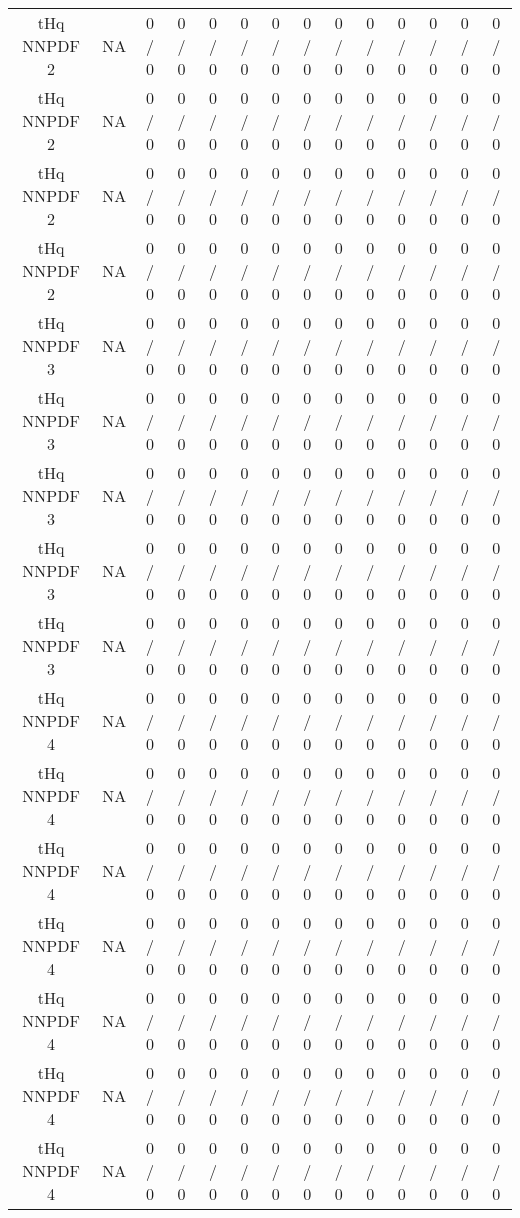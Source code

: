 \documentclass[10pt]{article}
\begin{document}
\begin{table}[htbp]
\begin{center}
\begin{tabular}{|c|c|c|c|c|c|c|c|c|c|c|c|c|c|}
  tHq NNPDF 2 &    NA    & 0 / 0 & 0 / 0 & 0 / 0 & 0 / 0 & 0 / 0 & 0 / 0 & 0 / 0 & 0 / 0 & 0 / 0 & 0 / 0 & 0 / 0 & 0 / 0 \\ 
  tHq NNPDF 2 &    NA    & 0 / 0 & 0 / 0 & 0 / 0 & 0 / 0 & 0 / 0 & 0 / 0 & 0 / 0 & 0 / 0 & 0 / 0 & 0 / 0 & 0 / 0 & 0 / 0 \\ 
  tHq NNPDF 2 &    NA    & 0 / 0 & 0 / 0 & 0 / 0 & 0 / 0 & 0 / 0 & 0 / 0 & 0 / 0 & 0 / 0 & 0 / 0 & 0 / 0 & 0 / 0 & 0 / 0 \\ 
  tHq NNPDF 2 &    NA    & 0 / 0 & 0 / 0 & 0 / 0 & 0 / 0 & 0 / 0 & 0 / 0 & 0 / 0 & 0 / 0 & 0 / 0 & 0 / 0 & 0 / 0 & 0 / 0 \\ 
  tHq NNPDF 3 &    NA    & 0 / 0 & 0 / 0 & 0 / 0 & 0 / 0 & 0 / 0 & 0 / 0 & 0 / 0 & 0 / 0 & 0 / 0 & 0 / 0 & 0 / 0 & 0 / 0 \\ 
  tHq NNPDF 3 &    NA    & 0 / 0 & 0 / 0 & 0 / 0 & 0 / 0 & 0 / 0 & 0 / 0 & 0 / 0 & 0 / 0 & 0 / 0 & 0 / 0 & 0 / 0 & 0 / 0 \\ 
  tHq NNPDF 3 &    NA    & 0 / 0 & 0 / 0 & 0 / 0 & 0 / 0 & 0 / 0 & 0 / 0 & 0 / 0 & 0 / 0 & 0 / 0 & 0 / 0 & 0 / 0 & 0 / 0 \\ 
  tHq NNPDF 3 &    NA    & 0 / 0 & 0 / 0 & 0 / 0 & 0 / 0 & 0 / 0 & 0 / 0 & 0 / 0 & 0 / 0 & 0 / 0 & 0 / 0 & 0 / 0 & 0 / 0 \\ 
  tHq NNPDF 3 &    NA    & 0 / 0 & 0 / 0 & 0 / 0 & 0 / 0 & 0 / 0 & 0 / 0 & 0 / 0 & 0 / 0 & 0 / 0 & 0 / 0 & 0 / 0 & 0 / 0 \\ 
  tHq NNPDF 4 &    NA    & 0 / 0 & 0 / 0 & 0 / 0 & 0 / 0 & 0 / 0 & 0 / 0 & 0 / 0 & 0 / 0 & 0 / 0 & 0 / 0 & 0 / 0 & 0 / 0 \\ 
  tHq NNPDF 4 &    NA    & 0 / 0 & 0 / 0 & 0 / 0 & 0 / 0 & 0 / 0 & 0 / 0 & 0 / 0 & 0 / 0 & 0 / 0 & 0 / 0 & 0 / 0 & 0 / 0 \\ 
  tHq NNPDF 4 &    NA    & 0 / 0 & 0 / 0 & 0 / 0 & 0 / 0 & 0 / 0 & 0 / 0 & 0 / 0 & 0 / 0 & 0 / 0 & 0 / 0 & 0 / 0 & 0 / 0 \\ 
  tHq NNPDF 4 &    NA    & 0 / 0 & 0 / 0 & 0 / 0 & 0 / 0 & 0 / 0 & 0 / 0 & 0 / 0 & 0 / 0 & 0 / 0 & 0 / 0 & 0 / 0 & 0 / 0 \\ 
  tHq NNPDF 4 &    NA    & 0 / 0 & 0 / 0 & 0 / 0 & 0 / 0 & 0 / 0 & 0 / 0 & 0 / 0 & 0 / 0 & 0 / 0 & 0 / 0 & 0 / 0 & 0 / 0 \\ 
  tHq NNPDF 4 &    NA    & 0 / 0 & 0 / 0 & 0 / 0 & 0 / 0 & 0 / 0 & 0 / 0 & 0 / 0 & 0 / 0 & 0 / 0 & 0 / 0 & 0 / 0 & 0 / 0 \\ 
  tHq NNPDF 4 &    NA    & 0 / 0 & 0 / 0 & 0 / 0 & 0 / 0 & 0 / 0 & 0 / 0 & 0 / 0 & 0 / 0 & 0 / 0 & 0 / 0 & 0 / 0 & 0 / 0 \\ 

\end{tabular}
\end{center}
\end{table}
\end{document}
